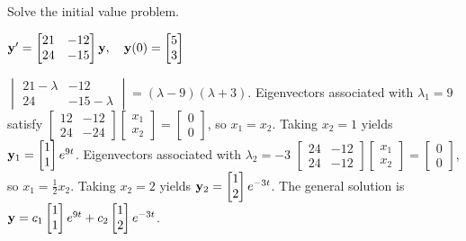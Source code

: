 \documentclass{ximera}
\begin{document}
\begin{problem}\label{exer:10.4.18}
Solve the initial value problem.

$ {\bf y}'=\begin{bmatrix}21&-12\\24&-15\end{bmatrix}{\bf y},\quad{\bf
y}(0)= \begin{bmatrix}5\\3\end{bmatrix}$

\begin{solution}
    $ \begin{vmatrix}21-\lambda&-12\\24&-15-\lambda\end{vmatrix}
=(\lambda-9)(\lambda+3)$.
Eigenvectors  associated with $\lambda_1=9$  satisfy
$ \begin{bmatrix}12&-12\\24&-24
\end{bmatrix}\begin{bmatrix}
x_1\\x_2\end{bmatrix}=\begin{bmatrix} 0\\0\end{bmatrix}$,
so $x_1=x_2$.  Taking $x_2=1$ yields
${\bf y}_1= \begin{bmatrix}1\\1\end{bmatrix}e^{9t}$.
Eigenvectors  associated with $\lambda_2=-3$
$ \begin{bmatrix}24&-12\\24&-12
\end{bmatrix}\begin{bmatrix}
x_1\\x_2\end{bmatrix}=\begin{bmatrix} 0\\0\end{bmatrix}$,
so $x_1=\frac{1 }{2}x_2$.  Taking $x_2=2$ yields
${\bf y}_2= \begin{bmatrix}1\\2\end{bmatrix}e^{-3t}$.
The general solution is
${\bf y}=c_1 \begin{bmatrix}1\\1\end{bmatrix}e^{9t}+c_2 \begin{bmatrix}1\\2\end{bmatrix}e^{-3t}$.

\end{solution}
\end{problem}
\end{document}
